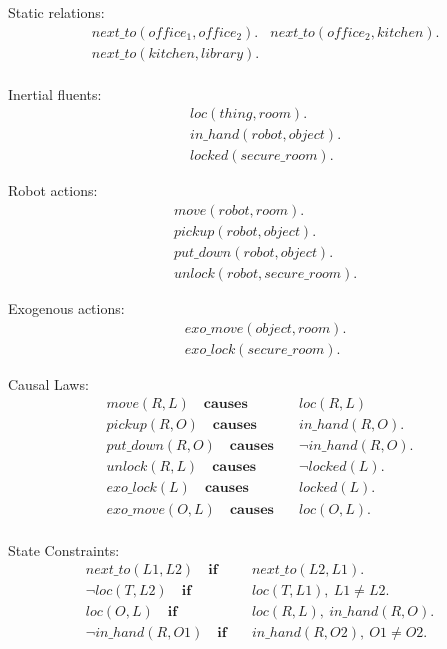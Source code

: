 \documentclass[11pt, oneside]{article}
\begin{document}
Static relations:
\begin{align*}
  &next\_to(office_1,office_2).
  &next\_to(office_2,kitchen).\\
  &next\_to(kitchen,library).\\
\end{align*}

Inertial fluents:
\begin{align*}
  &loc(thing, room).\\
  &in\_hand(robot,object).\\
  &locked(secure\_room).
\end{align*}

Robot actions:
\begin{align*}
  &move(robot, room).\\
  &pickup(robot,object).\\
  &put\_down(robot,object).\\
  &unlock(robot,secure\_room).
\end{align*}

Exogenous actions:
\begin{align*}
  &exo\_move(object, room).\\
  &exo\_lock(secure\_room).
\end{align*}

Causal Laws:
\begin{align*}
  move(R,L)\quad \mathbf{causes}&\quad loc(R,L)\\
  pickup(R,O)\quad \mathbf{causes}&\quad in\_hand(R,O). \\
  put\_down(R,O)\quad \mathbf{causes}&\quad \neg in\_hand(R,O).\\
  unlock(R,L)\quad \mathbf{causes}&\quad \neg locked(L).\\
  exo\_lock(L)\quad \mathbf{causes}&\quad locked(L).\\
  exo\_move(O,L)\quad \mathbf{causes}&\quad loc(O,L).\\
\end{align*}


State Constraints:
\begin{align*}
  next\_to(L1,L2)\quad \mathbf{if}&\quad next\_to(L2,L1).\\
  \neg loc(T, L2)\quad \mathbf{if}&\quad loc(T, L1), ~L1 \neq L2.\\
  loc(O, L)\quad \mathbf{if}&\quad loc(R, L),~in\_hand(R,O).\\
  \neg in\_hand(R,O1)\quad \mathbf{if}&\quad in\_hand(R,O2),~ O1 \neq O2.
\end{align*}
\end{document}
